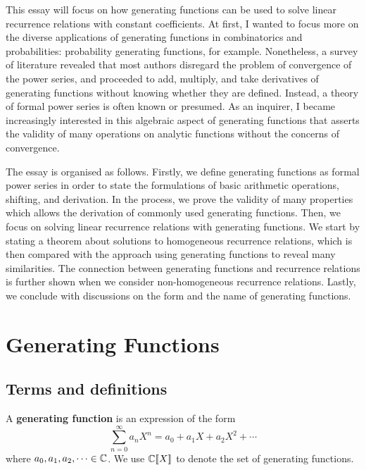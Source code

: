 \documentclass[a4paper, 12pt]{report}
\begin{document}
This essay will focus on how generating functions can be used to solve linear recurrence relations with constant coefficients. At first, I wanted to focus more on the diverse applications of generating functions in combinatorics and probabilities: probability generating functions, for example. Nonetheless, a survey of literature revealed that most authors disregard the problem of convergence of the power series, and proceeded to add, multiply, and take derivatives of generating functions without knowing whether they are defined. Instead, a theory of formal power series is often known or presumed. As an inquirer, I became increasingly interested in this algebraic aspect of generating functions that asserts the validity of many operations on analytic functions without the concerns of convergence.

The essay is organised as follows. Firstly, we define generating functions as formal power series in order to state the formulations of basic arithmetic operations, shifting, and derivation. In the process, we prove the validity of many properties which allows the derivation of commonly used generating functions. Then, we focus on solving linear recurrence relations with generating functions. We start by stating a theorem about solutions to homogeneous recurrence relations, which is then compared with the approach using generating functions to reveal many similarities. The connection between generating functions and recurrence relations is further shown when we consider non-homogeneous recurrence relations. Lastly, we conclude with discussions on the form and the name of generating functions.





{\let\clearpage\relax\chapter{Generating Functions}\label{ch:gf}}
\section{Terms and definitions}
\begin{defn}\label{def:gf-def}
A \textbf{generating function} is an expression of the form 
\[\sum_{n = 0}^{\infty} a_n X^n = a_0 + a_1 X + a_2 X^2 + \cdots\]
where $a_0, a_1, a_2, \dots \in \mathbb{C}$. We use $\mathbb{C}\llbracket X \rrbracket$ to denote the set of generating functions.
\end{defn}
\end{document}
